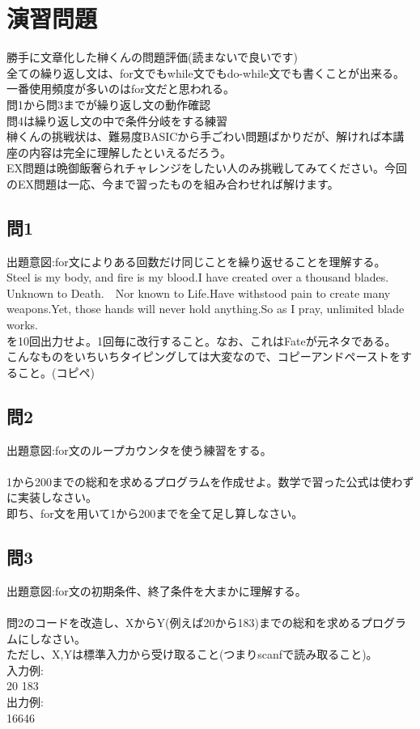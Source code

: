 \documentclass[a4j,titlepage,dvipdfmx]{jsarticle}   %
\begin{document}
\section{演習問題}
勝手に文章化した榊くんの問題評価(読まないで良いです)\\
全ての繰り返し文は、for文でもwhile文でもdo-while文でも書くことが出来る。\\
一番使用頻度が多いのはfor文だと思われる。\\
問1から問3までが繰り返し文の動作確認\\
問4は繰り返し文の中で条件分岐をする練習\\
榊くんの挑戦状は、難易度BASICから手ごわい問題ばかりだが、解ければ本講座の内容は完全に理解したといえるだろう。\\
EX問題は晩御飯奢られチャレンジをしたい人のみ挑戦してみてください。今回のEX問題は一応、今まで習ったものを組み合わせれば解けます。\\

\subsection{問1}
出題意図:for文によりある回数だけ同じことを繰り返せることを理解する。\\

Steel is my body, and fire is my blood.I have created over a thousand blades.　Unknown to Death.　Nor known to Life.Have withstood pain to create many weapons.Yet, those hands will never hold anything.So as I pray, unlimited blade works.\\
を10回出力せよ。1回毎に改行すること。なお、これはFateが元ネタである。\\
こんなものをいちいちタイピングしては大変なので、コピーアンドペーストをすること。(コピペ)\\

\subsection{問2}
出題意図:for文のループカウンタを使う練習をする。\\
\\
1から200までの総和を求めるプログラムを作成せよ。数学で習った公式は使わずに実装しなさい。\\
即ち、for文を用いて1から200までを全て足し算しなさい。\\

\subsection{問3}
出題意図:for文の初期条件、終了条件を大まかに理解する。\\
\\
問2のコードを改造し、XからY(例えば20から183)までの総和を求めるプログラムにしなさい。\\
ただし、X,Yは標準入力から受け取ること(つまりscanfで読み取ること)。\\
入力例:\\
20 183\\
出力例:\\
16646\\
\end{document}
